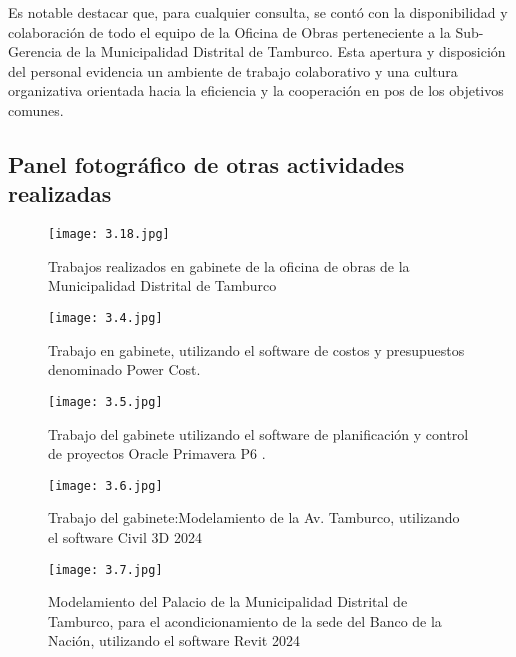 Es notable destacar que, para cualquier consulta, se contó con la disponibilidad y colaboración de todo el equipo de la Oficina de Obras perteneciente a la Sub-Gerencia de la Municipalidad Distrital de Tamburco. Esta apertura y disposición del personal evidencia un ambiente de trabajo colaborativo y una cultura organizativa orientada hacia la eficiencia y la cooperación en pos de los objetivos comunes.
\newpage
\subsection{Panel fotográfico de otras actividades realizadas}
\begin{figure}[h]
	\captionsetup{width=0.8\textwidth}
	\centering
	\texttt{[image: 3.18.jpg]}
	\caption[Trabajos realizados en gabinete]{Trabajos realizados en gabinete de la oficina de obras de la Municipalidad Distrital de Tamburco}
	\label{fig:img20230825125748803}
\end{figure}

\begin{figure}[h]
	\captionsetup{width=0.8\textwidth}
	\centering
	\texttt{[image: 3.4.jpg]}
	\caption[Trabajo en gabinete: Uso del software Power Cost]{Trabajo en gabinete, utilizando el software de costos y presupuestos denominado Power Cost.}
	\label{fig:img20230825131400193}
\end{figure}

\begin{figure}[h]
	\captionsetup{width=0.8\textwidth}
	\centering
	\texttt{[image: 3.5.jpg]}
	\caption[Trabajo en gabinete: Uso del software Oracle Primavera]{Trabajo del gabinete utilizando el software de planificación y control de proyectos Oracle Primavera P6 .}
	\label{fig:img20230825131405944}
\end{figure}

\begin{figure}[h]
	\captionsetup{width=0.8\textwidth}
	\centering
	\texttt{[image: 3.6.jpg]}
	\caption[Trabajo de gabinete: Uso del software Civil 3D 2024]{Trabajo del gabinete:Modelamiento de la Av. Tamburco, utilizando el software Civil 3D 2024}
	\label{fig:img20230825131413779}
\end{figure}

\begin{figure}[h]
	\captionsetup{width=0.8\textwidth}
	\centering
	\texttt{[image: 3.7.jpg]}
	\caption[Trabajo en gabinete: Modelamiento del Palacio Municipal de Tamburco utilizando Revit 2024]{Modelamiento del Palacio de la Municipalidad Distrital de Tamburco, para el acondicionamiento de la sede del Banco de la Nación, utilizando el software Revit 2024}
	\label{fig:img20230825131426665}
\end{figure}


